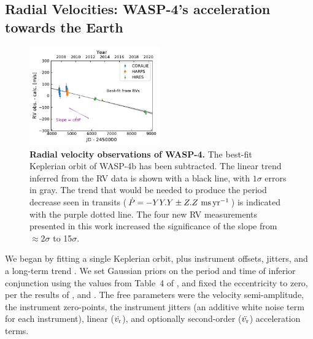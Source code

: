 \documentclass[12pt,twocolumn,tighten]{aastex62}
\begin{document}
\subsection{Radial Velocities: WASP-4's acceleration towards the Earth}

\begin{figure}[t]
	\begin{center}
		\leavevmode
		\includegraphics[width=0.5\textwidth]{f2.pdf}
	\end{center}
	\vspace{-0.7cm}
	\caption{
    {\bf Radial velocity observations of WASP-4.} The best-fit Keplerian orbit
    of WASP-4b has been subtracted.  The linear trend inferred from the
    RV data is shown with a black line, with $1\sigma$ errors in gray.
    The trend that would be needed to produce the period decrease seen
    in transits ($\dot{P}= - YY.Y \pm Z.Z~{\rm ms}\,{\rm yr}^{-1}$) is
    indicated with the purple dotted line.  The four new RV
    measurements presented in this work increased the significance of
    the slope from $\approx$2$\sigma$ to 15$\sigma$.
	\label{fig:rvs}
  \vspace{-0.3cm}
	}
\end{figure}

We began by fitting a single Keplerian orbit, plus instrument offsets,
jitters, and a long-term trend
\citep[][\texttt{radvel}]{fulton_radvel_2018}.  We set Gaussian priors
on the period and time of inferior conjunction using the values from
Table~4 of , and fixed the eccentricity
to zero, per the results of \citet{beerer_secondary_2011},
\citet{knutson_friends_2014} and \citet{bonomo_gaps_2017}.  The free
parameters were the velocity semi-amplitude, the instrument
zero-points, the instrument jitters (an additive white noise term for
each instrument), linear ($\dot{v_{\rm r}}$), and optionally
second-order ($\ddot{v_{\rm r}}$) acceleration terms.
\end{document}
